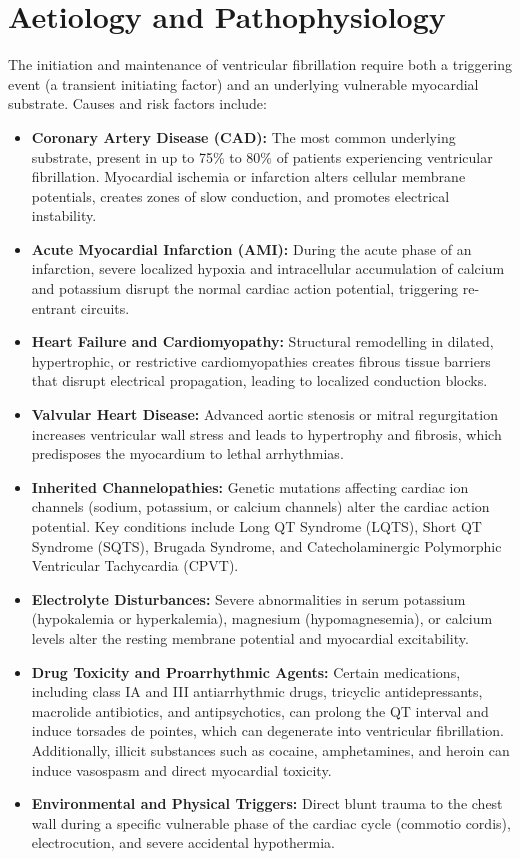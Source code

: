 \section*{Aetiology and Pathophysiology}
The initiation and maintenance of ventricular fibrillation require both a triggering event (a transient initiating factor) and an underlying vulnerable myocardial substrate.
Causes and risk factors include:
\begin{itemize}
    \item \textbf{Coronary Artery Disease (CAD):} The most common underlying substrate, present in up to 75\% to 80\% of patients experiencing ventricular fibrillation. Myocardial ischemia or infarction alters cellular membrane potentials, creates zones of slow conduction, and promotes electrical instability.
    \item \textbf{Acute Myocardial Infarction (AMI):} During the acute phase of an infarction, severe localized hypoxia and intracellular accumulation of calcium and potassium disrupt the normal cardiac action potential, triggering re-entrant circuits.
    \item \textbf{Heart Failure and Cardiomyopathy:} Structural remodelling in dilated, hypertrophic, or restrictive cardiomyopathies creates fibrous tissue barriers that disrupt electrical propagation, leading to localized conduction blocks.
    \item \textbf{Valvular Heart Disease:} Advanced aortic stenosis or mitral regurgitation increases ventricular wall stress and leads to hypertrophy and fibrosis, which predisposes the myocardium to lethal arrhythmias.
    \item \textbf{Inherited Channelopathies:} Genetic mutations affecting cardiac ion channels (sodium, potassium, or calcium channels) alter the cardiac action potential. Key conditions include Long QT Syndrome (LQTS), Short QT Syndrome (SQTS), Brugada Syndrome, and Catecholaminergic Polymorphic Ventricular Tachycardia (CPVT).
    \item \textbf{Electrolyte Disturbances:} Severe abnormalities in serum potassium (hypokalemia or hyperkalemia), magnesium (hypomagnesemia), or calcium levels alter the resting membrane potential and myocardial excitability.
    \item \textbf{Drug Toxicity and Proarrhythmic Agents:} Certain medications, including class IA and III antiarrhythmic drugs, tricyclic antidepressants, macrolide antibiotics, and antipsychotics, can prolong the QT interval and induce torsades de pointes, which can degenerate into ventricular fibrillation. Additionally, illicit substances such as cocaine, amphetamines, and heroin can induce vasospasm and direct myocardial toxicity.
    \item \textbf{Environmental and Physical Triggers:} Direct blunt trauma to the chest wall during a specific vulnerable phase of the cardiac cycle (commotio cordis), electrocution, and severe accidental hypothermia.
\end{itemize}
